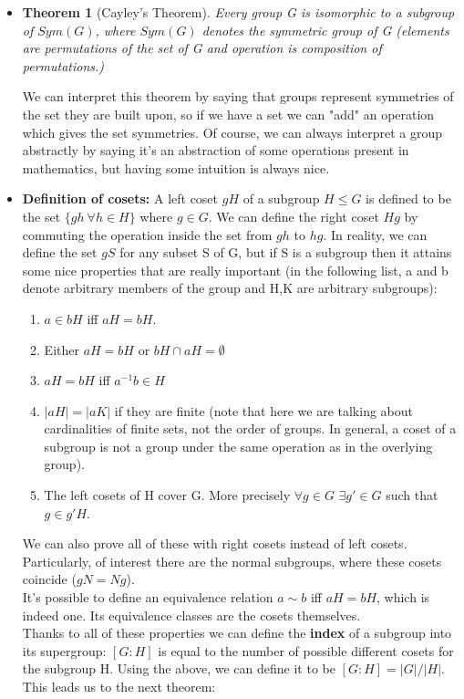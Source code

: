 \documentclass[a4paper]{article}
\newtheorem{theorem}{Theorem}[section]
\begin{document}
\begin{itemize}
\item
\begin{theorem}[Cayley's Theorem]
Every group G is isomorphic to a subgroup of $Sym(G)$, where $Sym(G)$ denotes the symmetric group of G (elements are permutations of the set of G and operation is composition of permutations.)
\end{theorem}
We can interpret this theorem by saying that groups represent symmetries of the set they are built upon, so if we have a set we can "add" an operation which gives the set symmetries. Of course, we can always interpret a group abstractly by saying it's an abstraction of some operations present in mathematics, but having some intuition is always nice.

\item
\textbf{Definition of cosets: }A left coset $gH$ of a subgroup $H\leq G$ is defined to be the set $\{gh\ \forall h \in H \}$ where $g \in G$. We can define the right coset $Hg$ by commuting the operation inside the set from $gh$ to $hg$. In reality, we can define the set $gS$ for any subset S of G, but if S is a subgroup then it attains some nice properties that are really important (in the following list, a and b denote arbitrary members of the group and H,K are arbitrary subgroups):
\begin{enumerate}
\item
$a \in bH$ iff $aH=bH$.
\item
Either $aH=bH$ or $bH\cap aH=\emptyset$
\item
$aH=bH$ iff $a^{-1}b \in H$ 
\item
$|aH|=|aK|$ if they are finite (note that here we are talking about cardinalities of finite sets, not the order of groups. In general, a coset of a subgroup is not a group under the same operation as in the overlying group).
\item
The left cosets of H cover G. More precisely $\forall g \in G$ $\exists g' \in G$ such that $g\in g'H$.
\end{enumerate}
We can also prove all of these with right cosets instead of left cosets. Particularly, of interest there are the normal subgroups, where these cosets coincide ($gN = Ng$).\\
It's possible to define an equivalence relation $a\sim b$ iff $aH=bH$, which is indeed one. Its equivalence classes are the cosets themselves.\\
Thanks to all of these properties we can define the \textbf{index} of a subgroup into its supergroup: $[G:H]$ is equal to the number of possible different cosets for the subgroup H. Using the above, we can define it to be $[G:H]=|G|/|H|$. This leads us to the next theorem:


\end{itemize}
\end{document}
